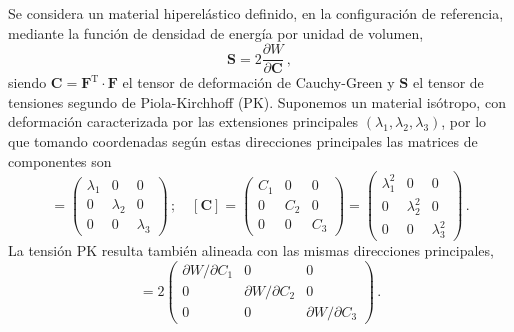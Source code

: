 Se considera un material hiperelástico definido, en la configuración de referencia, mediante la función de densidad de energía por unidad de volumen,
\begin{equation}
  \bm{S} = 2\frac{\partial W}{\partial\bm{C}}\,,
\end{equation}
siendo 
$\bm{C}=\bm{F}^\text{T}\cdot\bm{F}$ 
el tensor de deformación de Cauchy-Green
y $\bm{S}$ el tensor de tensiones segundo de Piola-Kirchhoff (PK). 
Suponemos un material isótropo, con deformación caracterizada por las extensiones principales 
$(\lambda_1,\lambda_2,\lambda_3)$, 
por lo que tomando coordenadas según estas direcciones principales las matrices de componentes son
\begin{equation}
  [\bm{F}]=\begin{pmatrix}
  \lambda_1 & 0 & 0 \\ 0 & \lambda_2 & 0 \\ 0 & 0 & \lambda_3
  \end{pmatrix}
  \,;\quad
  [\bm{C}]
  =\begin{pmatrix}
  C_1 & 0 & 0 \\ 0 & C_2 & 0 \\ 0 & 0 & C_3
  \end{pmatrix}
  =\begin{pmatrix}
  \lambda_1^2 & 0 & 0 \\ 0 & \lambda_2^2 & 0 \\ 0 & 0 & \lambda_3^2
  \end{pmatrix}
  \,.
  \label{eq:FC}
\end{equation}
La tensión PK resulta también alineada con las mismas direcciones principales,
\begin{equation}
  [\bm{S}]=2\begin{pmatrix}
  {\partial W}/{\partial C_1} & 0 & 0 \\ 
  0 & {\partial W}/{\partial C_2} & 0 \\
  0 & 0 & {\partial W}/{\partial C_3}
  \end{pmatrix}
  \,.
  \label{eq:S}
\end{equation}
